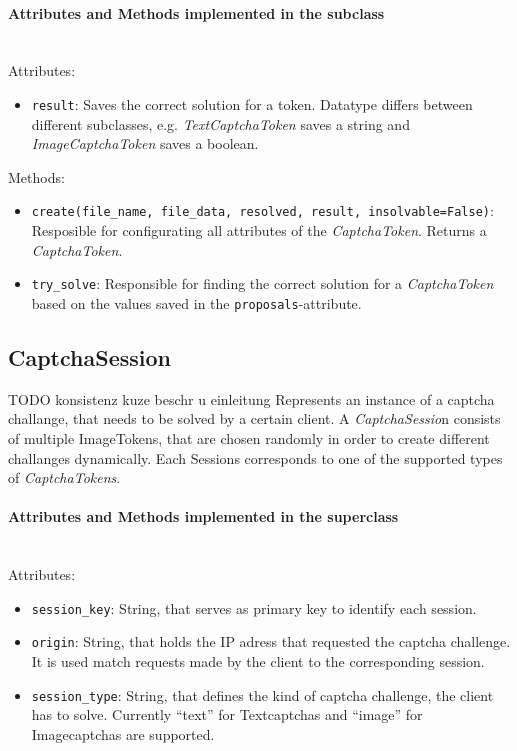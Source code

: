\paragraph{Attributes and Methods implemented in the subclass}  \mbox{} \\



Attributes: 


\begin{itemize}
\item \verb|result|: Saves the correct solution for a token. Datatype differs between different subclasses, e.g. \emph{TextCaptchaToken} saves a string and \emph{ImageCaptchaToken} saves a boolean.
\end{itemize}


Methods:


\begin{itemize}
\item \verb|create(file_name, file_data, resolved, result, insolvable=False)|: Resposible for configurating all attributes of the \emph{CaptchaToken}. Returns a \emph{CaptchaToken}.
\item \verb|try_solve|: Responsible for finding the correct solution for a \emph{CaptchaToken} based on the values saved in the \verb|proposals|-attribute.
\end{itemize}


\subsection{CaptchaSession}
TODO konsistenz kuze beschr u einleitung
Represents an instance of a captcha challange, that needs to be solved by a certain client. A \emph{CaptchaSessio}n consists of multiple ImageTokens, that are chosen randomly in order to create different challanges dynamically. Each Sessions corresponds to one of the supported types of \emph{CaptchaTokens}.


\paragraph{Attributes and Methods implemented in the superclass} \mbox{} \\


Attributes:

\begin{itemize}
\item \verb|session_key|: String, that serves as primary key to identify each session. 
\item \verb|origin|: String, that holds the IP adress that requested the captcha challenge. It is used match requests made by the client to the corresponding session.
\item \verb|session_type|: String, that defines the kind of captcha challenge, the client has to solve. Currently ``text'' for Textcaptchas and ``image'' for Imagecaptchas are supported.
\end{itemize}



